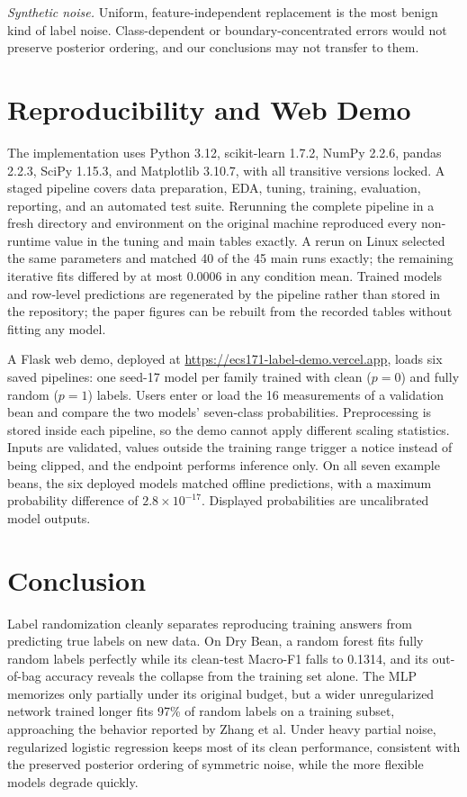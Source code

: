 \documentclass[conference,letterpaper]{IEEEtran}
\begin{document}
\textit{Synthetic noise.} Uniform, feature-independent replacement is the most benign kind of label noise. Class-dependent or boundary-concentrated errors would not preserve posterior ordering, and our conclusions may not transfer to them.

\section{Reproducibility and Web Demo}
\label{sec:repro}
The implementation uses Python 3.12, scikit-learn 1.7.2, NumPy 2.2.6, pandas 2.2.3, SciPy 1.15.3, and Matplotlib 3.10.7, with all transitive versions locked. A staged pipeline covers data preparation, EDA, tuning, training, evaluation, reporting, and an automated test suite. Rerunning the complete pipeline in a fresh directory and environment on the original machine reproduced every non-runtime value in the tuning and main tables exactly. A rerun on Linux selected the same parameters and matched 40 of the 45 main runs exactly; the remaining iterative fits differed by at most 0.0006 in any condition mean. Trained models and row-level predictions are regenerated by the pipeline rather than stored in the repository; the paper figures can be rebuilt from the recorded tables without fitting any model.

A Flask web demo, deployed at \url{https://ecs171-label-demo.vercel.app}, loads six saved pipelines: one seed-17 model per family trained with clean ($p=0$) and fully random ($p=1$) labels. Users enter or load the 16 measurements of a validation bean and compare the two models' seven-class probabilities. Preprocessing is stored inside each pipeline, so the demo cannot apply different scaling statistics. Inputs are validated, values outside the training range trigger a notice instead of being clipped, and the endpoint performs inference only. On all seven example beans, the six deployed models matched offline predictions, with a maximum probability difference of $2.8\times10^{-17}$. Displayed probabilities are uncalibrated model outputs.

\section{Conclusion}
\label{sec:conclusion}
Label randomization cleanly separates reproducing training answers from predicting true labels on new data. On Dry Bean, a random forest fits fully random labels perfectly while its clean-test Macro-F1 falls to 0.1314, and its out-of-bag accuracy reveals the collapse from the training set alone. The MLP memorizes only partially under its original budget, but a wider unregularized network trained longer fits 97\% of random labels on a training subset, approaching the behavior reported by Zhang et al. Under heavy partial noise, regularized logistic regression keeps most of its clean performance, consistent with the preserved posterior ordering of symmetric noise, while the more flexible models degrade quickly.
\end{document}
